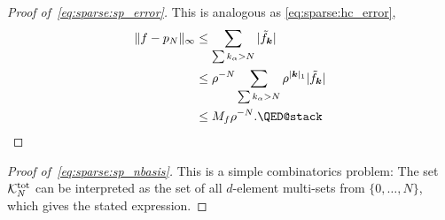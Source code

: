 \begin{proof}[Proof of~\ref{eq:sparse:sp_error}]
    This is analogous as  \eqref{eq:sparse:hc_error},
    \begin{align*}
        \|f - p_N\|_\infty
        &\leq \sum_{\sum k_\alpha > N} |\tilde{f}_\bk| \\
        &\leq \rho^{-N} \sum_{\sum k_\alpha > N} \rho^{|\bk|_1} |\tilde{f}_\bk| \\
        &\leq M_f \rho^{-N}. \qedhere
    \end{align*}
\end{proof}
\begin{proof}[Proof of~\eqref{eq:sparse:sp_nbasis}]
    This is a simple combinatorics problem: The set $\mathcal{K}_N^{\rm tot}$ can be
    interpreted as the set of all $d$-element multi-sets from
    $\{0, \dots, N\}$, which gives the stated expression.
\end{proof}
